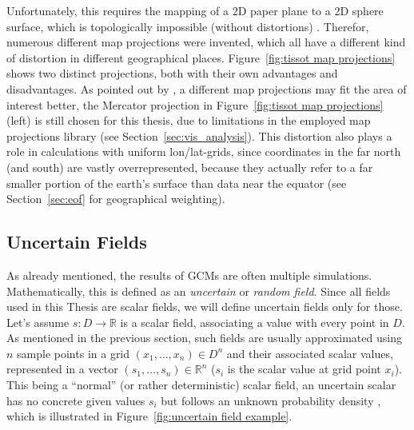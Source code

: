 Unfortunately, this requires the mapping of a 2D paper plane to a 2D sphere surface, which is topologically impossible (without distortions) \cite{vietinghoffdiss}.
Therefor, numerous different map projections were invented, which all have a different kind of distortion in different geographical places. 
Figure~\ref{fig:tissot map projections} shows two distinct projections, both with their own advantages and disadvantages. 
As pointed out by , a different map projections may fit the area of interest better, the Mercator projection in Figure~\ref{fig:tissot map projections} (left) is still chosen for this thesis, due to limitations in the employed map projections library (see Section~\ref{sec:vis_analysis}). 
This distortion also plays a role in calculations with uniform lon/lat-grids, since coordinates in the far north (and south) are vastly overrepresented, because they actually refer to a far smaller portion of the earth's surface than data near the equator (see Section~\ref{sec:eof} for geographical weighting). 


\subsection{Uncertain Fields}


As already mentioned, the results of GCMs are often multiple simulations. 
Mathematically, this is defined as an \textit{uncertain} or \textit{random field}. 
Since all fields used in this Thesis are scalar fields, we will define uncertain fields only for those. 
Let's assume $s : D \rightarrow \mathbb{R}$ is a scalar field, associating a value  with every point in $D$. 
As mentioned in the previous section, such fields are usually approximated using $n$ sample points in a grid $(x_1,\dots, x_n) \in D^n$ and their associated scalar values, represented in a vector $(s_1,\dots,s_n) \in \mathbb{R}^n$ ($s_i$ is the scalar value at grid point $x_i$).
This being a \enquote{normal} (or rather deterministic) scalar field, an uncertain scalar has no concrete given values $s_i$ but follows an unknown probability density \cite{vietinghoffdiss}, which is illustrated in Figure~\ref{fig:uncertain field example}. 


